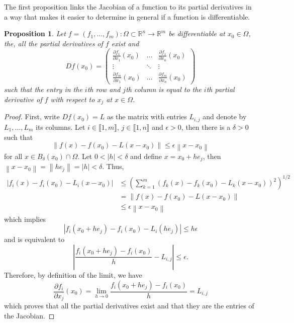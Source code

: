 \documentclass{article}
\theoremstyle{plain}
\newtheorem{proposition}[theorem]{Proposition}
\theoremstyle{definition}
\newcommand{\R}{\mathbb{R}}
\newcommand{\Iint}[2]{\llbracket #1 , #2 \rrbracket}
\newcommand{\norm}[1]{\left\lVert#1 \right\rVert}
\begin{document}
The first proposition links the Jacobian of a function to its partial derivatives in a way that makes it easier to determine in general if a function is differentiable.

\begin{proposition}
    Let $f = (f_1, ..., f_m) : \Omega \subset \R^n \to \R^m$ be differentiable at $x_0 \in \Omega$, the, all the partial derivatives of $f$ exist and
    $$Df(x_0) = \begin{pmatrix}
        \frac{\partial f_1}{\partial x_1}(x_0) & \dots & \frac{\partial f_1}{\partial x_n}(x_0) \\ \vdots & \ddots & \vdots \\ \frac{\partial f_m}{\partial x_1}(x_0) & \dots & \frac{\partial f_m}{\partial x_n}(x_0)
    \end{pmatrix}$$
    such that the entry in the $i$th row and $j$th column is equal to the $i$th partial derivative of $f$ with respect to $x_j$ at $x \in \Omega$.
\end{proposition}

\begin{proof}
    First, write $Df(x_0) = L$ as the matrix with entries $L_{i,j}$ and denote by $L_1, ..., L_m$ its columns. Let $i \in \Iint{1}{m}$, $j \in \Iint{1}{n}$ and $\epsilon > 0$, then there is a $\delta > 0$ such that
    $$\norm{f(x) - f(x_0) - L(x - x_0)} \leq \epsilon \norm{x - x_0}$$
    for all $x \in B_{\delta}(x_0)\cap \Omega$. Let $0 < |h| < \delta$ and define $x = x_0 + he_j$, then $\norm{x - x_0} = \norm{he_j} = |h| < \delta$. Thus,
    \begin{align*}
        |f_i(x) - f_i(x_0) - L_i(x - x_0)|&\leq \left(\sum_{k=1}^{m}(f_k(x) - f_k(x_0) - L_k(x - x_0))^2\right)^{1/2} \\
        &= \norm{f(x) - f(x_0) - L(x - x_0)} \\
        &\leq \epsilon \norm{x - x_0}
    \end{align*}
    which implies
    $$|f_i(x_0 + he_j) - f_i(x_0) - L_i(he_j)| \leq h \epsilon$$
    and is equivalent to
    $$\left|\frac{f_i(x_0 + he_j) - f_i(x_0)}{h} - L_{i,j} \right| \leq \epsilon.$$
    Therefore, by definition of the limit, we have
    $$\frac{\partial f_i}{\partial x_j}(x_0) = \lim_{h \rightarrow 0}\frac{f_i(x_0 + he_j) - f_i(x_0)}{h} = L_{i,j}$$
    which proves that all the partial derivatives exist and that they are the entries of the Jacobian. 
\end{proof}
\end{document}
